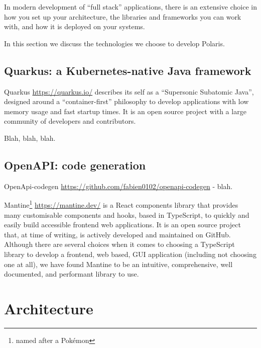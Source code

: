 \documentclass[11pt,twoside]{article}
\begin{document}
In modern development of ``full stack'' applications, there is an extensive choice in how you set up your
architecture, the libraries and frameworks you can work with, and how it is deployed on your systems.

In this section we discuss the technologies we choose to develop Polaris.

\subsection{Quarkus: a Kubernetes-native Java framework}\label{subsec:quarkus}

Quarkus \url{https://quarkus.io/} describes its self as a ``Supersonic Subatomic Java'', designed around a
``container-first'' philosophy to develop applications with low memory usage and fast startup times.
It is an open source project with a large community of developers and contributors.

Blah, blah, blah.

\subsection{OpenAPI: code generation}\label{subsec:openapi-code-generation}

OpenApi-codegen \url{https://github.com/fabien0102/openapi-codegen}  - blah.


Mantine\footnote{named after a Pok\'emon} \url{https://mantine.dev/} is a React components library that
provides many customisable components and hooks, based in TypeScript, to quickly and easily build accessible
frontend web applications.
It is an open source project that, at time of writing, is actively developed and maintained on GitHub.
Although there are several choices when it comes to choosing a TypeScript library to develop a frontend,
web based, GUI application (including not choosing one at all), we have found Mantine to be an intuitive,
comprehensive, well documented, and performant library to use.


\section{Architecture}\label{sec:architecture}

\end{document}
